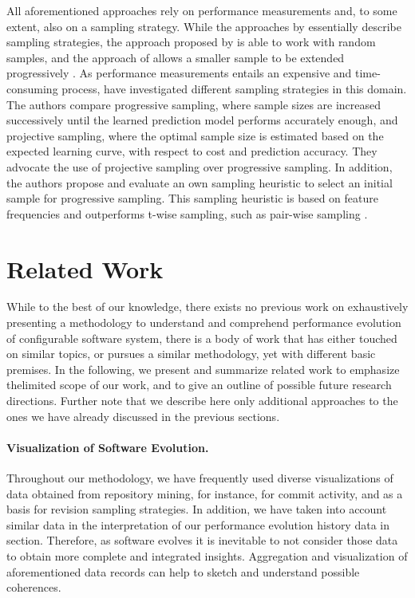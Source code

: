 All aforementioned approaches rely on performance measurements and, to
some extent, also on a  sampling strategy. While the approaches by
\cite{siegmund_predicting_2012,siegmund_performance-influence_2015} essentially describe sampling strategies,
the approach proposed by \cite{zhang_performance_2015} is able to work with random samples, and the
approach of \cite{guo_variability-aware_2013} allows a smaller sample to be
extended progressively \citep{guo_variability-aware_2013}.
As performance measurements entails an expensive and time-consuming process,
\cite{sarkar_cost-efficient_2015} have investigated different sampling
strategies in this domain.
The authors compare progressive sampling, where sample sizes are increased
successively until the learned prediction model performs accurately enough, and projective
sampling, where the optimal sample size is estimated based on the expected
learning curve, with respect to cost and prediction accuracy. They advocate the
use of projective sampling over progressive sampling. In addition, the authors
propose and evaluate an own sampling heuristic to select an initial sample for
progressive sampling. This sampling heuristic is based on feature frequencies
and outperforms t-wise sampling, such as pair-wise sampling
\citep{sarkar_cost-efficient_2015}.

\section{Related Work}
While to the best of our knowledge, there exists no previous work on
exhaustively presenting a methodology to understand and comprehend performance
evolution of configurable software system, there is a body of work that has
either touched on similar topics, or pursues a similar methodology, yet with
different basic premises. In the following, we present and summarize related
work to emphasize thelimited scope of our work, and to give an outline of
possible future research directions. Further note that we describe here only
additional approaches to the ones we have already discussed in the previous
sections.

\paragraph{Visualization of Software Evolution.}
Throughout our methodology, we have frequently used diverse visualizations of
data obtained from repository mining, for instance, for commit activity, and as
a basis for revision sampling strategies. In addition, we have taken into
account similar data in the interpretation of our performance evolution history
data in section. Therefore, as software evolves it is inevitable to not
consider those data to obtain more complete and integrated insights.
Aggregation and visualization of aforementioned data records can help to sketch
and understand possible coherences.

